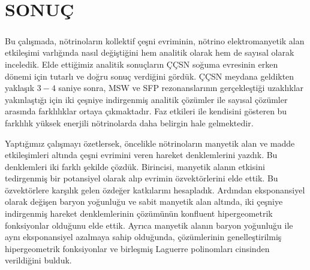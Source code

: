 \newpage
\chapter{SONUÇ}\label{ch:sonuc}
\paragraph{}
Bu çalışmada, nötrinoların kollektif çeşni evriminin, nötrino elektromanyetik alan etkileşimi varlığında nasıl değiştiğini hem analitik olarak hem de sayısal olarak inceledik. Elde ettiğimiz analitik sonuçların ÇÇSN soğuma evresinin erken dönemi için tutarlı ve doğru sonuç verdiğini gördük. ÇÇSN meydana geldikten yaklaşık $ 3-4 $ saniye sonra, MSW ve SFP rezonanslarının gerçekleştiği uzaklıklar yakınlaştığı için iki çeşniye indirgenmiş analitik çözümler ile sayısal çözümler arasında farklılıklar ortaya çıkmaktadır. Faz etkileri ile kendisini gösteren bu farklılık yüksek enerjili nötrinolarda daha belirgin hale gelmektedir.

Yaptığımız çalışmayı özetlersek, öncelikle nötrinoların manyetik alan ve madde etkileşimleri altında çeşni evrimini veren hareket denklemlerini yazdık. Bu denklemleri iki farklı şekilde çözdük. Birincisi, manyetik alanın etkisini tedirgenmiş bir potansiyel olarak alıp evrimin özvektörlerini elde ettik. Bu özvektörlere karşılık gelen özdeğer katkılarını hesapladık. Ardından eksponansiyel olarak değişen baryon yoğunluğu ve sabit manyetik alan altında, iki çeşniye indirgenmiş hareket denklemlerinin çözümünün konfluent hipergeometrik fonksiyonlar olduğunu elde ettik. Ayrıca manyetik alanın baryon yoğunluğu ile aynı eksponansiyel azalmaya sahip olduğunda, çözümlerinin genelleştirilmiş hipergeometrik fonksiyonlar ve birleşmiş Laguerre polinomları cinsinden verildiğini bulduk.

